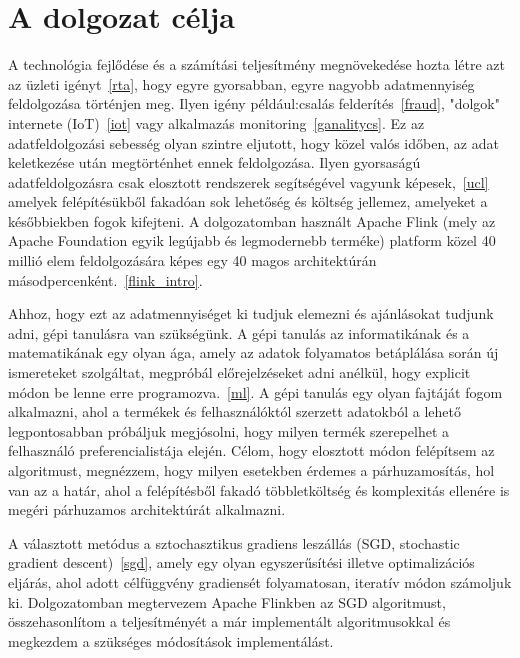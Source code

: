 \documentclass[a4paper,12pt]{article}
\begin{document}
\section{A dolgozat célja}
A technológia fejlődése és a számítási teljesítmény megnövekedése hozta létre azt az üzleti igényt~\ref{rta}, hogy egyre gyorsabban, egyre nagyobb adatmennyiség feldolgozása történjen meg. Ilyen igény például:csalás felderítés~\ref{fraud}, "dolgok" internete (IoT)~\ref{iot} vagy alkalmazás monitoring~\ref{ganalitycs}. Ez az adatfeldolgozási sebesség olyan szintre eljutott, hogy közel valós időben, az adat keletkezése után megtörténhet ennek feldolgozása. Ilyen gyorsaságú adatfeldolgozásra csak elosztott rendszerek segítségével vagyunk képesek,~\ref{ucl} amelyek felépítésükből fakadóan sok lehetőség és költség jellemez, amelyeket a későbbiekben fogok kifejteni. A dolgozatomban használt Apache Flink (mely az Apache Foundation egyik legújabb és legmodernebb terméke) platform közel 40 millió elem feldolgozására képes egy 40 magos architektúrán másodpercenként.~\ref{flink_intro}.  \linebreak

Ahhoz, hogy ezt az adatmennyiséget ki tudjuk elemezni és ajánlásokat tudjunk adni, gépi tanulásra van szükségünk. A gépi tanulás az informatikának és a matematikának egy olyan ága, amely az adatok folyamatos betáplálása során új ismereteket szolgáltat, megpróbál előrejelzéseket adni anélkül, hogy explicit módon be lenne erre programozva.~\ref{ml}. A gépi tanulás egy olyan fajtáját fogom alkalmazni, ahol a termékek és felhasználóktól szerzett adatokból a lehető legpontosabban próbáljuk megjósolni, hogy milyen termék szerepelhet a felhasználó preferencialistája elején. Célom, hogy elosztott módon felépítsem az algoritmust, megnézzem, hogy milyen esetekben érdemes a párhuzamosítás, hol van az a határ, ahol a felépítésből fakadó többletköltség és komplexitás ellenére is megéri párhuzamos architektúrát alkalmazni. 
\linebreak

A választott metódus a sztochasztikus gradiens leszállás (SGD, stochastic gradient descent)~\ref{sgd}, amely egy olyan egyszerűsítési illetve optimalizációs eljárás, ahol adott célfüggvény gradiensét folyamatosan, iteratív módon számoljuk ki. Dolgozatomban megtervezem Apache Flinkben az SGD algoritmust, összehasonlítom a teljesítményét a már implementált algoritmusokkal és megkezdem a szükséges módosítások implementálást.
\end{document}
